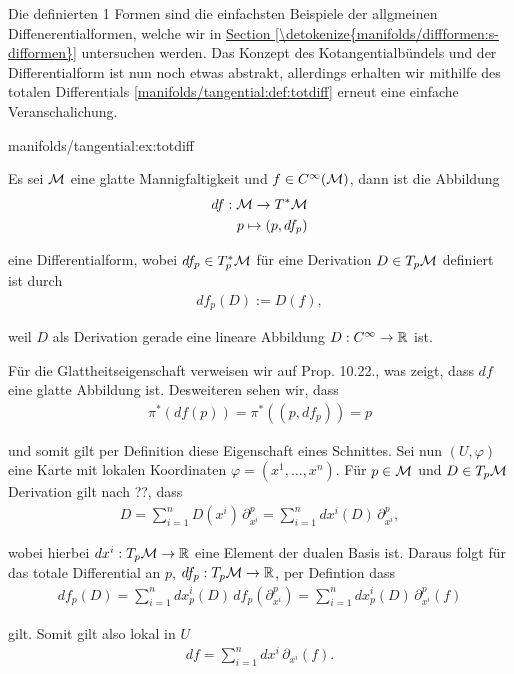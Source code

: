 \par
Die definierten 1 Formen sind die einfachsten Beispiele der allgmeinen Diffenerentialformen, welche wir in \hyperref[\detokenize{manifolds/diffformen:s-difformen}]{Section \ref{\detokenize{manifolds/diffformen:s-difformen}}} untersuchen werden. Das Konzept des Kotangentialbündels und der Differentialform ist nun noch etwas abstrakt, allerdings erhalten wir mithilfe des totalen Differentials \cref{manifolds/tangential:def:totdiff} erneut eine einfache Veranschalichung.
\begin{example}{}{manifolds/tangential:ex:totdiff}



\par
Es sei \(\mathcal{M}\) eine glatte Mannigfaltigkeit und \(f\in C^\infty(\mathcal{M})\), dann ist die Abbildung
\begin{align*}
df:\mathcal{M}\to T^\ast\mathcal{M}\\
p\mapsto (p, df_p)
\end{align*}
\par
eine Differentialform, wobei \(df_p\in T_p^\ast\mathcal{M}\) für eine Derivation \(D\in T_p\mathcal{M}\) definiert ist durch
\begin{align*}
df_p(D) := D(f),
\end{align*}
\par
weil \(D\) als Derivation gerade eine lineare Abbildung \(D:C^\infty\to\mathbb{R}\) ist.

\par
Für die Glattheitseigenschaft verweisen wir auf \cite{Lee03} Prop. 10.22., was zeigt, dass \(df\) eine glatte Abbildung ist. Desweiteren sehen wir, dass
\begin{align*}
\pi^\ast(df(p)) = \pi^\ast((p,df_p)) = p\end{align*}
\par
und somit gilt per Definition diese Eigenschaft eines Schnittes. Sei nun \((U,\varphi)\) eine Karte mit lokalen Koordinaten \(\varphi = (x^1,\ldots, x^n)\). Für \(p\in\mathcal{M}\) und \(D\in T_p\mathcal{M}\) Derivation gilt nach ??, dass
\begin{align*}
D = \sum_{i=1}^n D(x^i)\, \partial_{x^i}^p = \sum_{i=1}^n dx^{i}(D)\, \partial_{x^i}^p,
\end{align*}
\par
wobei hierbei \(dx^{i}:T_p\mathcal{M}\to\mathbb{R}\) eine Element der dualen Basis ist. Daraus folgt für das totale Differential an \(p\), \(df_p:T_p\mathcal{M}\to\mathbb{R}\), per Defintion dass
\begin{align*}
df_p(D) = \sum_{i=1}^n dx_p^{i}(D)\, df_p(\partial_{x^i}^p) = 
\sum_{i=1}^n dx_p^{i}(D)\, \partial_{x^i}^p(f)
\end{align*}
\par
gilt. Somit gilt also lokal in \(U\)
\begin{align*}
df = \sum_{i=1}^n dx^{i}\, \partial_{x^i}(f).
\end{align*}\end{example}

